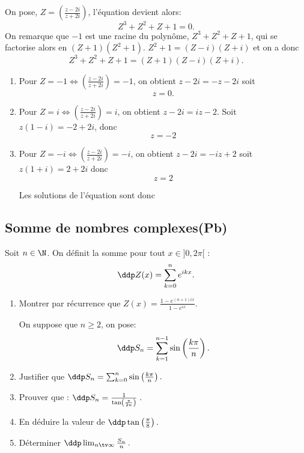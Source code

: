 \begin{correction}
On pose, $Z =\left(\frac{z-2i}{z+2i}\right)$, l'équation devient alors: 
$$Z^3+Z^2+Z+1=0.$$
On  remarque que $-1$ est une racine du polynôme,   $Z^3+Z^2+Z+1$, qui se factorise alors en 
$(Z+1)(Z^2+1)$. $Z^2+1 =(Z-i)(Z+i)$ et on  a donc 
$$Z^3+Z^2+Z+1 =(Z+1)(Z-i)(Z+i).$$

\begin{enumerate}
\item Pour $Z=-1 \Longleftrightarrow \left(\frac{z-2i}{z+2i}\right)=-1$, on obtient 
$z-2i =-z-2i$ soit $$z=0.$$
\item Pour $Z=i \Longleftrightarrow \left(\frac{z-2i}{z+2i}\right)=i$, on obtient 
$z-2i =iz-2$. Soit $z(1-i) = -2+2i$, donc 
$$z=-2$$


\item Pour $Z=-i \Longleftrightarrow \left(\frac{z-2i}{z+2i}\right)=-i$, on obtient 
$z-2i =-iz+2$ soit $z(1+i) =2+2i$ donc 
$$z=2$$



Les solutions de l'équation sont donc 

\end{enumerate}



\end{correction}





\subsection{Somme de nombres complexes(Pb)}
\begin{exercice}
 Soit  $n\in \N$. On définit la somme pour tout $x \in ]0, 2\pi[$ :
$$\ddp Z(x) =\sum_{k=0}^n e^{ikx}.$$
\begin{enumerate}
\item Montrer par récurrence que $Z(x) = \frac{1-e^{(n+1)ix}}{1-e^{ix}}$.

On suppose que $n\geq 2$, on pose: 
$$\ddp S_n = \sum_{k=1}^{n-1} \sin \left( \frac{k\pi}{n}\right).$$
\item Justifier que $\ddp S_n = \sum_{k=0}^{n} \sin \left( \frac{k\pi}{n}\right).$\\
\item Prouver que : $\ddp S_n = \frac{1}{ \tan \left( \frac{\pi}{2n}\right)}\, $.\\
\item En déduire la valeur de $\ddp \tan \left( \frac{\pi}{8}\right).$\\
\item Déterminer $\ddp \lim_{n\tv \infty} \frac{S_n}{n}\, .$
\end{enumerate}
\end{exercice}


